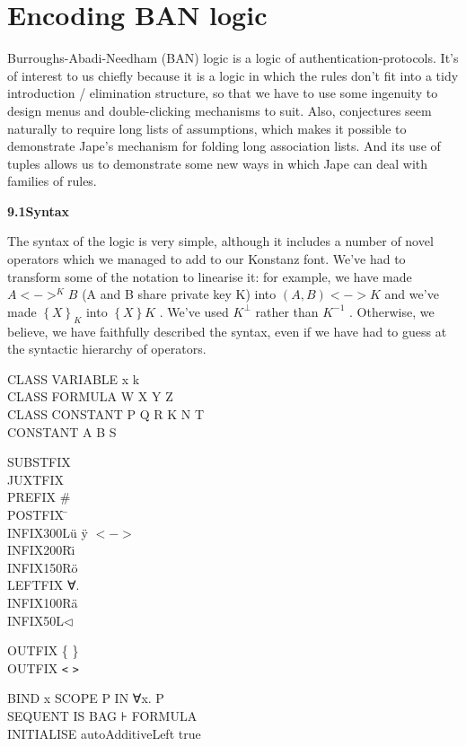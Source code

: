 
\chapter{Encoding BAN logic}
\label{chap:BAN}

Burroughs-Abadi-Needham (BAN) logic is a logic of authentication-protocols. It's of interest to us chiefly because it is a logic in which the rules don't fit into a tidy introduction / elimination structure, so that we have to use some ingenuity to design menus and double-clicking mechanisms to suit. Also, conjectures seem naturally to require long lists of assumptions, which makes it possible to demonstrate Jape's mechanism for folding long association lists. And its use of tuples allows us to demonstrate some new ways in which Jape can deal with families of rules.


\textbf{{\large 9.1\tab Syntax}}


The syntax of the logic is very simple, although it includes a number of novel operators which we managed to add to our Konstanz font. We've had to transform some of the notation to linearise it: for example, we have made $A<->^{K} B$ (A and B share private key K) into $\left( A,B\right) <->K$ and we've made $\left\{ X\right\} _{K} $ into $\left\{ X\right\} K$ . We've used $K^{\bot } $ rather than $K^{-1} $ . Otherwise, we believe, we have faithfully described the syntax, even if we have had to guess at the syntactic hierarchy of operators.

CLASS VARIABLE x k\\
CLASS FORMULA W X Y Z\\
CLASS CONSTANT P Q R K N T\\
CONSTANT A B S

SUBSTFIX\\
JUXTFIX\\
PREFIX \tab \#\\
POSTFIX \tab \={}\\
INFIX\tab 300L\tab \"{u} \"{y} $<->$\\
INFIX\tab 200R\tab \"{\i}\\
INFIX\tab 150R\tab \"{o}\\
LEFTFIX \tab ∀.\\
INFIX\tab 100R\tab \"{a}\\
INFIX\tab 50L\tab $\triangleleft$

OUTFIX \{ \}\\
OUTFIX \texttt{<} \texttt{>}

BIND x SCOPE P IN ∀x. P\\
SEQUENT IS BAG ⊦ FORMULA\\
INITIALISE autoAdditiveLeft true


